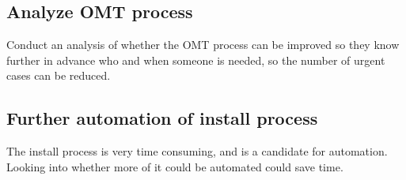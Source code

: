 \subsection{Analyze OMT process}
Conduct an analysis of whether the OMT process can be improved so they know further in advance who and when someone is needed, so the number of urgent cases can be reduced.

\subsection{Further automation of install process}
The install process is very time consuming, and is a candidate for automation.
Looking into whether more of it could be automated could save time.

